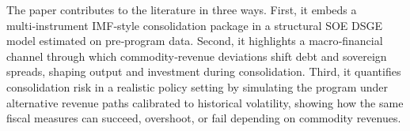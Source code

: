 \documentclass[12pt]{article}
\begin{document}
The paper contributes to the literature in three ways. First, it embeds a multi‑instrument IMF‑style consolidation package in a structural SOE DSGE model estimated on pre‑program data. Second, it highlights a macro‑financial channel through which commodity‑revenue deviations shift debt and sovereign spreads, shaping output and investment during consolidation. Third, it quantifies consolidation risk in a realistic policy setting by simulating the program under alternative revenue paths calibrated to historical volatility, showing how the same fiscal measures can succeed, overshoot, or fail depending on commodity revenues.


\end{document}

